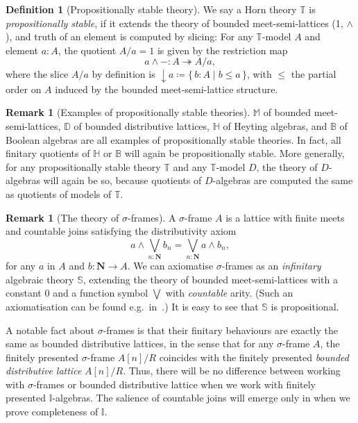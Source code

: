 \documentclass[a4paper,12pt]{amsart}
\theoremstyle{definition}
\newtheorem{definition}[theorem]{Definition}
\newtheorem{remark}[theorem]{Remark}
\newcommand{\mb}[1]{\mathbf{#1}}
\newcommand{\mbb}[1]{\mathbb{#1}}
\newcommand{\T}{\mbb T}
\newcommand{\I}{\mbb I}
\newcommand{\scomp}[2]{\{\,#1\mid#2\,\}}
\newcommand{\surj}{\twoheadrightarrow}
\newcommand{\cv}{\operatorname{\downarrow}}
\newcommand{\N}{\mb N}
\begin{document}
\begin{definition}[Propositionally stable theory]\label{defn:propositional}
  We say a Horn theory $\T$ is \emph{propositionally stable}, if it extends the theory of bounded meet-semi-lattices (1, $\wedge$), and truth of an element is computed by slicing: For any $\T$-model $A$ and element $a:A$, the quotient $A/a=1$ is given by the restriction map
  \[ a \wedge - : A \surj A/a, \]
  where the slice $A/a$ by definition is ${\cv} a \coloneq \scomp{b:A}{b\le a}$, with $\le$ the partial order on $A$ induced by the bounded meet-semi-lattice structure.
\end{definition}


\begin{remark}[Examples of propositionally stable theories]
  $\mbb M$ of bounded meet-semi-lattices, $\mbb D$ of bounded distributive lattices, $\mbb H$ of Heyting algebras, and $\mbb B$ of Boolean algebras are all examples of propositionally stable theories. In fact, all finitary quotients of $\mbb H$ or $\mbb B$ will again be propositionally stable. More generally, for any propositionally stable theory $\T$ and any $\T$-model $D$, the theory of $D$-algebras will again be so, because quotients of $D$-algebras are computed the same as quotients of models of $\T$.
\end{remark}

\begin{remark}[The theory of $\sigma$-frames]\label{rem:sigmaframe}
  A $\sigma$-frame $A$ is a lattice with finite meets and countable joins satisfying the distributivity axiom 
  \[ a \wedge \bigvee_{n:\N} b_n = \bigvee_{n:\N} a \wedge b_n, \]
  for any $a$ in $A$ and $b \colon \N \to A$. We can axiomatise $\sigma$-frames as an \emph{infinitary} algebraic theory $\mbb S$, extending the theory of bounded meet-semi-lattices with a constant $0$ and a function symbol $\bigvee$ with \emph{countable} arity. (Such an axiomatisation can be found e.g.\ in~\citet[Exa.~3.26]{adamek1994locally}.) It is easy to see that $\mbb S$ is propositional. 

  A notable fact about $\sigma$-frames is that their finitary behaviours are exactly the same as bounded distributive lattices, in the sense that for any $\sigma$-frame $A$, the finitely presented $\sigma$-frame $A[n]/R$ coincides with the finitely presented \emph{bounded distributive lattice} $A[n]/R$. Thus, there will be no difference between working with $\sigma$-frames or bounded distributive lattice when we work with finitely presented $\I$-algebras. The salience of countable joins will emerge only in  when we prove completeness of $\I$.
\end{remark}
\end{document}
